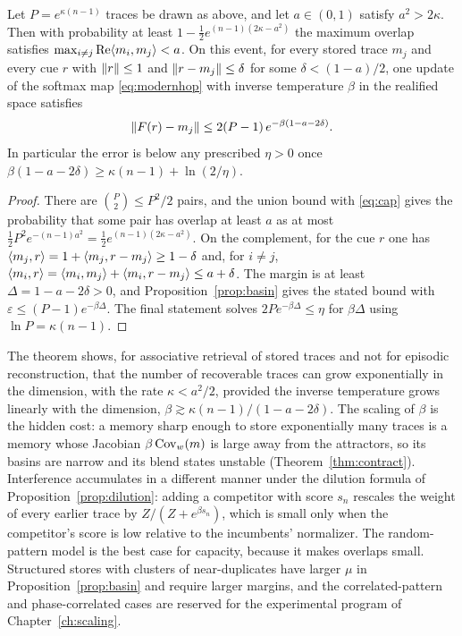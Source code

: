 \begin{theorem}\label{thm:capacity}
Let $P=e^{\kappa(n-1)}$ traces be drawn as above, and let $a\in(0,1)$ satisfy $a^2>2\kappa$. Then with probability at least $1-\tfrac12e^{(n-1)(2\kappa-a^2)}$ the maximum overlap satisfies $\max_{i\ne j}\operatorname{Re}\langle m_i,m_j\rangle<a$. On this event, for every stored trace $m_j$ and every cue $r$ with $\lVert r\rVert\le1$ and $\lVert r-m_j\rVert\le\delta$ for some $\delta<(1-a)/2$, one update of the softmax map \eqref{eq:modernhop} with inverse temperature $\beta$ in the realified space satisfies
\begin{equation}
\lVert F(r)-m_j\rVert\le2(P-1)\,e^{-\beta(1-a-2\delta)}.
\end{equation}
In particular the error is below any prescribed $\eta>0$ once $\beta(1-a-2\delta)\ge\kappa(n-1)+\ln(2/\eta)$.
\end{theorem}

\begin{proof}
There are $\binom P2\le P^2/2$ pairs, and the union bound with \eqref{eq:cap} gives the probability that some pair has overlap at least $a$ as at most $\tfrac12P^2e^{-(n-1)a^2}=\tfrac12e^{(n-1)(2\kappa-a^2)}$. On the complement, for the cue $r$ one has $\langle m_j,r\rangle=1+\langle m_j,r-m_j\rangle\ge1-\delta$ and, for $i\ne j$, $\langle m_i,r\rangle=\langle m_i,m_j\rangle+\langle m_i,r-m_j\rangle\le a+\delta$. The margin is at least $\Delta=1-a-2\delta>0$, and Proposition~\ref{prop:basin} gives the stated bound with $\varepsilon\le(P-1)e^{-\beta\Delta}$. The final statement solves $2Pe^{-\beta\Delta}\le\eta$ for $\beta\Delta$ using $\ln P=\kappa(n-1)$.
\end{proof}

The theorem shows, for associative retrieval of stored traces and not for episodic reconstruction, that the number of recoverable traces can grow exponentially in the dimension, with the rate $\kappa<a^2/2$, provided the inverse temperature grows linearly with the dimension, $\beta\gtrsim\kappa(n-1)/(1-a-2\delta)$. The scaling of $\beta$ is the hidden cost: a memory sharp enough to store exponentially many traces is a memory whose Jacobian $\beta\operatorname{Cov}_w(m)$ is large away from the attractors, so its basins are narrow and its blend states unstable (Theorem~\ref{thm:contract}). Interference accumulates in a different manner under the dilution formula of Proposition~\ref{prop:dilution}: adding a competitor with score $s_n$ rescales the weight of every earlier trace by $Z/(Z+e^{\beta s_n})$, which is small only when the competitor's score is low relative to the incumbents' normalizer. The random-pattern model is the best case for capacity, because it makes overlaps small. Structured stores with clusters of near-duplicates have larger $\mu$ in Proposition~\ref{prop:basin} and require larger margins, and the correlated-pattern and phase-correlated cases are reserved for the experimental program of Chapter~\ref{ch:scaling}.

